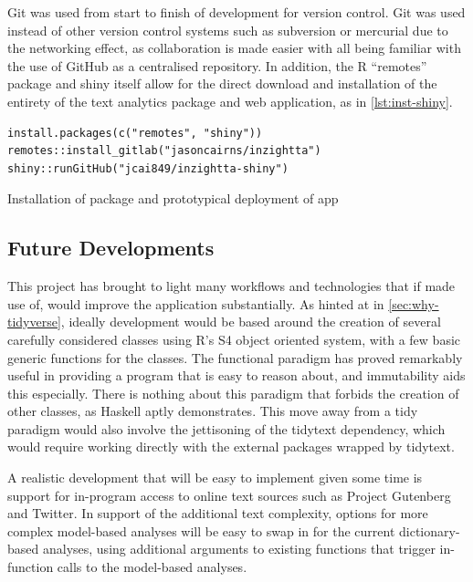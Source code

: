 \documentclass[11pt, a4paper, twoside, titlepage]{report}
\begin{document}
Git was used from start to finish of development for version control.
Git was used instead of other version control systems such as
subversion or mercurial due to the networking effect, as collaboration
is made easier with all being familiar with the use of GitHub as a
centralised repository. In addition, the R ``remotes'' package and
shiny itself allow for the direct download and installation of the
entirety of the text analytics package and web application, as in
\cref{lst:inst-shiny}.

\begin{listing}[ht]
\begin{verbatim}
install.packages(c("remotes", "shiny"))
remotes::install_gitlab("jasoncairns/inzightta")
shiny::runGitHub("jcai849/inzightta-shiny")
\end{verbatim}
\caption{Installation of package and prototypical deployment of app\label{lst:inst-shiny}}
\end{listing}
\subsection{Future Developments}

This project has brought to light many workflows and technologies that
if made use of, would improve the application substantially. As hinted
at in \cref{sec:why-tidyverse}, ideally development would be based
around the creation of several carefully considered classes using R's
S4 object oriented system, with a few basic generic functions for the
classes. The functional paradigm has proved remarkably useful in
providing a program that is easy to reason about, and immutability
aids this especially. There is nothing about this paradigm that
forbids the creation of other classes, as Haskell aptly
demonstrates\autocite{Hudak07ahistory}. This move away from a tidy
paradigm would also involve the jettisoning of the tidytext
dependency, which would require working directly with the external
packages wrapped by tidytext.

A realistic development that will be easy to implement given some time
is support for in-program access to online text sources such as
Project Gutenberg and Twitter. In support of the additional text
complexity, options for more complex model-based analyses will be easy
to swap in for the current dictionary-based analyses, using additional
arguments to existing functions that trigger in-function calls to the
model-based analyses.
\end{document}
